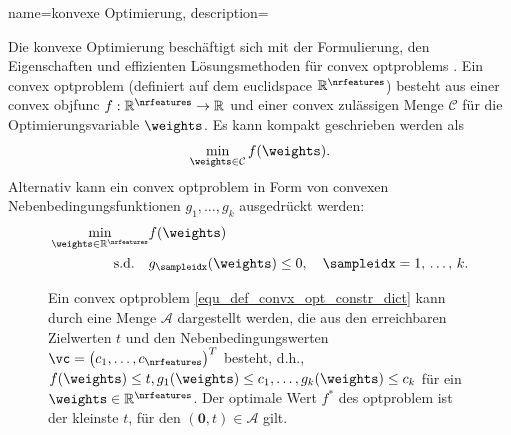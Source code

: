  {
    name={konvexe Optimierung},
    description={Die konvexe Optimierung beschäftigt sich mit der Formulierung, den Eigenschaften und effizienten Lösungsmethoden für \gls{convex} \glspl{optproblem} \cite{BoydConvexBook}. Ein \gls{convex} \gls{optproblem} (definiert auf dem \gls{euclidspace} $\mathbb{R}^{\nrfeatures}$) besteht aus einer \gls{convex} \gls{objfunc} $f: \mathbb{R}^{\nrfeatures} \rightarrow \mathbb{R}$ und einer \gls{convex} zulässigen Menge $\mathcal{C}$ für die Optimierungsvariable $\weights$. Es kann kompakt geschrieben werden als \cite{BoydConvexBook} 
    $$
    \min_{\weights \in \mathcal{C}} f(\weights).
    $$
    Alternativ kann ein \gls{convex} \gls{optproblem} in Form von \gls{convex}en Nebenbedingungsfunktionen $g_1,\ldots,g_k$ ausgedrückt werden:
    \begin{align}
    \min_{\weights \in \mathbb{R}^{\nrfeatures}} & f(\weights) \nonumber \\
    \text{s.d.} \quad & g_{\sampleidx}(\weights) \leq 0, \quad \sampleidx=1,\,\ldots,\,k. \label{equ_def_convx_opt_constr_dict}
    \end{align}
    \begin{figure}
    \centering
    \caption{Ein \gls{convex} \gls{optproblem} \eqref{equ_def_convx_opt_constr_dict} kann durch eine Menge $\mathcal{A}$ dargestellt werden,
	 die aus den erreichbaren Zielwerten $t$ und den Nebenbedingungswerten $\vc=\big(c_{1},\ldots,c_{\nrfeatures}\big)^{T}$ besteht, 
	 d.h., $f(\weights) \leq t, g_{1}(\weights)\leq c_{1},\ldots, g_{k}(\weights) \leq c_{k}$ für ein $\weights \in \mathbb{R}^{\nrfeatures}$.
	 Der optimale Wert $f^{\ast}$ des \gls{optproblem} ist der kleinste $t$, für den $(\mathbf{0},t) \in \mathcal{A}$ gilt.}
    \end{figure}

}}
